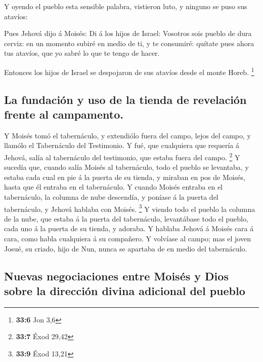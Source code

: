  Y oyendo el pueblo esta sensible palabra, vistieron luto,
y ninguno se puso sus atavíos:

 Pues Jehová dijo á Moisés: Di á los hijos de Israel:
Vosotros sois pueblo de dura cerviz: en un momento subiré en medio de
ti, y te consumiré: quítate pues ahora tus atavíos, que yo sabré lo que
te tengo de hacer.

 Entonces los hijos de Israel se despojaron de sus atavíos
desde el monte Horeb. \footnote{\textbf{33:6} Jon 3,6}

\hypertarget{la-fundaciuxf3n-y-uso-de-la-tienda-de-revelaciuxf3n-frente-al-campamento.}{%
\subsection{La fundación y uso de la tienda de revelación frente al
campamento.}\label{la-fundaciuxf3n-y-uso-de-la-tienda-de-revelaciuxf3n-frente-al-campamento.}}

 Y Moisés tomó el tabernáculo, y extendiólo fuera del
campo, lejos del campo, y llamólo el Tabernáculo del Testimonio. Y fué,
que cualquiera que requería á Jehová, salía al tabernáculo del
testimonio, que estaba fuera del campo. \footnote{\textbf{33:7} Éxod
  29,42}  Y sucedía que, cuando salía Moisés al
tabernáculo, todo el pueblo se levantaba, y estaba cada cual en pie á la
puerta de su tienda, y miraban en pos de Moisés, hasta que él entraba en
el tabernáculo.  Y cuando Moisés entraba en el
tabernáculo, la columna de nube descendía, y poníase á la puerta del
tabernáculo, y Jehová hablaba con Moisés. \footnote{\textbf{33:9} Éxod
  13,21}  Y viendo todo el pueblo la columna de la nube,
que estaba á la puerta del tabernáculo, levantábase todo el pueblo, cada
uno á la puerta de su tienda, y adoraba.  Y hablaba
Jehová á Moisés cara á cara, como habla cualquiera á su compañero. Y
volvíase al campo; mas el joven Josué, su criado, hijo de Nun, nunca se
apartaba de en medio del tabernáculo.

\hypertarget{nuevas-negociaciones-entre-moisuxe9s-y-dios-sobre-la-direcciuxf3n-divina-adicional-del-pueblo}{%
\subsection{Nuevas negociaciones entre Moisés y Dios sobre la dirección
divina adicional del
pueblo}\label{nuevas-negociaciones-entre-moisuxe9s-y-dios-sobre-la-direcciuxf3n-divina-adicional-del-pueblo}}

